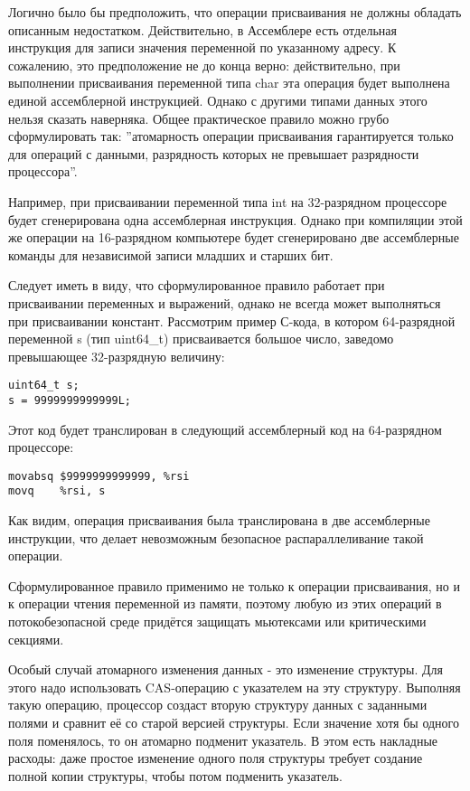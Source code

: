Логично было бы предположить, что операции присваивания не должны обладать описанным недостатком. Действительно, в Ассемблере есть отдельная инструкция для записи значения переменной по указанному адресу. К сожалению, это предположение не до конца верно: действительно, при выполнении присваивания переменной типа char эта операция будет выполнена единой ассемблерной инструкцией. Однако с другими типами данных этого нельзя сказать наверняка. Общее практическое правило можно грубо сформулировать так: ''атомарность операции присваивания гарантируется только для операций с данными, разрядность которых не превышает разрядности процессора''. 

Например, при присваивании переменной типа int на 32-разрядном процессоре будет сгенерирована одна ассемблерная инструкция. Однако при компиляции этой же операции на 16-разрядном компьютере будет сгенерировано две ассемблерные команды для независимой записи младших и старших бит.

Следует иметь в виду, что сформулированное правило работает при присваивании переменных и выражений, однако не всегда может выполняться при присваивании констант. Рассмотрим пример С-кода, в котором 64-разрядной переменной s (тип uint64\_t) присваивается большое число, заведомо превышающее 32-разрядную величину:

\begin{verbatim}
uint64_t s;
s = 9999999999999L;
\end{verbatim}

Этот код будет транслирован в следующий ассемблерный код на 64-разрядном процессоре:

\begin{verbatim}
movabsq $9999999999999, %rsi
movq	%rsi, s
\end{verbatim}

Как видим, операция присваивания была транслирована в две ассемблерные инструкции, что делает невозможным безопасное распараллеливание такой операции.

Сформулированное правило применимо не только к операции присваивания, но и к операции чтения переменной из памяти, поэтому любую из этих операций в потокобезопасной среде придётся защищать мьютексами или критическими секциями.

Особый случай атомарного изменения данных - это изменение структуры. Для этого надо использовать CAS-операцию с указателем на эту структуру. Выполняя такую операцию, процессор создаст вторую структуру данных с заданными полями и сравнит её со старой версией структуры. Если значение хотя бы одного поля поменялось, то он атомарно подменит указатель. В этом есть накладные расходы: даже простое изменение одного поля структуры требует создание полной копии структуры, чтобы потом подменить указатель.
